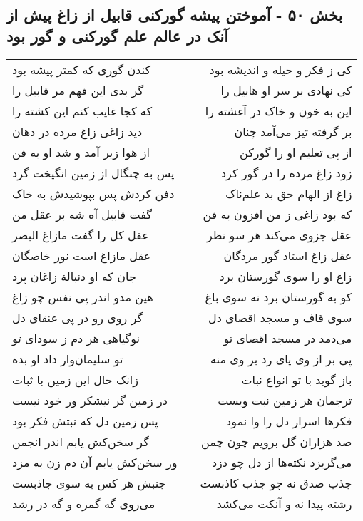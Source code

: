 \begin{center}
\section*{بخش ۵۰ - آموختن پیشه گورکنی قابیل از زاغ پیش از آنک در عالم علم گورکنی و گور بود}
\label{sec:sh050}
\begin{longtable}{l p{0.5cm} r}
کندن گوری که کمتر پیشه بود
&&
کی ز فکر و حیله و اندیشه بود
\\
گر بدی این فهم مر قابیل را
&&
کی نهادی بر سر او هابیل را
\\
که کجا غایب کنم این کشته را
&&
این به خون و خاک در آغشته را
\\
دید زاغی زاغ مرده در دهان
&&
بر گرفته تیز می‌آمد چنان
\\
از هوا زیر آمد و شد او به فن
&&
از پی تعلیم او را گورکن
\\
پس به چنگال از زمین انگیخت گرد
&&
زود زاغ مرده را در گور کرد
\\
دفن کردش پس بپوشیدش به خاک
&&
زاغ از الهام حق بد علم‌ناک
\\
گفت قابیل آه شه بر عقل من
&&
که بود زاغی ز من افزون به فن
\\
عقل کل را گفت مازاغ البصر
&&
عقل جزوی می‌کند هر سو نظر
\\
عقل مازاغ است نور خاصگان
&&
عقل زاغ استاد گور مردگان
\\
جان که او دنبالهٔ زاغان پرد
&&
زاغ او را سوی گورستان برد
\\
هین مدو اندر پی نفس چو زاغ
&&
کو به گورستان برد نه سوی باغ
\\
گر روی رو در پی عنقای دل
&&
سوی قاف و مسجد اقصای دل
\\
نوگیاهی هر دم ز سودای تو
&&
می‌دمد در مسجد اقصای تو
\\
تو سلیمان‌وار داد او بده
&&
پی بر از وی پای رد بر وی منه
\\
زانک حال این زمین با ثبات
&&
باز گوید با تو انواع نبات
\\
در زمین گر نیشکر ور خود نیست
&&
ترجمان هر زمین نبت ویست
\\
پس زمین دل که نبتش فکر بود
&&
فکرها اسرار دل را وا نمود
\\
گر سخن‌کش یابم اندر انجمن
&&
صد هزاران گل برویم چون چمن
\\
ور سخن‌کش یابم آن دم زن به مزد
&&
می‌گریزد نکته‌ها از دل چو دزد
\\
جنبش هر کس به سوی جاذبست
&&
جذب صدق نه چو جذب کاذبست
\\
می‌روی گه گمره و گه در رشد
&&
رشته پیدا نه و آنکت می‌کشد
\\

\end{longtable}
\end{center}
